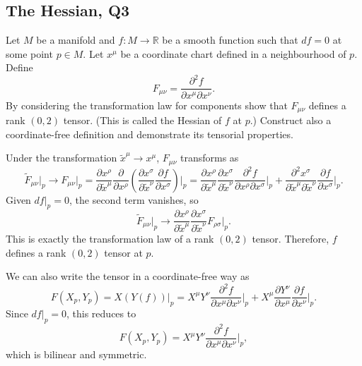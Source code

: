 \subsection{The Hessian, Q3}

Let $M$ be a manifold and $f:M\to\mathbb{R}$ be a smooth function such that $df=0$ at some point $p\in M$. Let $x^\mu$ be a coordinate chart defined in a neighbourhood of $p$. Define
\begin{equation}
    F_{\mu\nu} = \frac{\partial^2 f}{\partial x^\mu\partial x^\nu}.
\end{equation}
By considering the transformation law for components show that $F_{\mu\nu}$ defines a rank $(0,2)$ tensor. (This is called the Hessian of $f$ at $p$.) Construct also a coordinate-free definition and demonstrate its tensorial properties.
\begin{solution}
    Under the transformation $\tilde{x}^\mu \to x^\mu$, $F_{\mu\nu}$ transforms as 
    \begin{equation}
        \tilde{F}_{\mu\nu}\bigg|_p \to F_{\mu\nu}\bigg|_p 
        = \frac{\partial x^\rho}{\partial \tilde{x}^\mu}
        \frac{\partial}{\partial x^\rho}
        \left(
            \frac{\partial x^\sigma}{\partial \tilde{x}^\nu}
            \frac{\partial f}{\partial x^\sigma}
        \right)\bigg|_p
        = \frac{\partial x^\rho}{\partial \tilde{x}^\mu}
        \frac{\partial x^\sigma}{\partial \tilde{x}^\nu}
        \frac{\partial^2 f}{\partial x^\rho \partial x^\sigma}\bigg|_p
        + \frac{\partial^2 x^\sigma}{\partial \tilde{x}^\mu \partial \tilde{x}^\nu}
        \frac{\partial f}{\partial x^\sigma}\bigg|_p.
    \end{equation}
    Given $df|_p = 0$, the second term vanishes, so
    \begin{equation}
        \tilde{F}_{\mu\nu}\bigg|_p \to 
        \frac{\partial x^\rho}{\partial \tilde{x}^\mu}
        \frac{\partial x^\sigma}{\partial \tilde{x}^\nu}
        F_{\rho\sigma}\bigg|_p.
    \end{equation}
    This is exactly the transformation law of a rank $(0,2)$ tensor. Therefore, $f$ defines a rank $(0,2)$ tensor at $p$.

    We can also write the tensor in a coordinate-free way as
    \begin{equation}
        F(X_p,Y_p) = X(Y(f))|_p 
        = X^\mu Y^\nu \frac{\partial^2 f}{\partial x^\mu \partial x^\nu}\bigg|_p 
        + X^\mu \frac{\partial Y^\nu}{\partial x^\mu} \frac{\partial f}{\partial x^\nu}\bigg|_p.
    \end{equation}
    Since $df|_p = 0$, this reduces to
    \begin{equation}
        F(X_p,Y_p) 
        = X^\mu Y^\nu \frac{\partial^2 f}{\partial x^\mu \partial x^\nu}\bigg|_p,
    \end{equation}
    which is bilinear and symmetric.
\end{solution}

